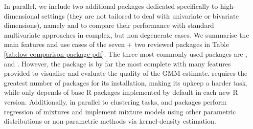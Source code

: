 In parallel, we include two additional packages dedicated specifically to high-dimensional settings (they are not tailored to deal with univariate or bivariate dimensions), namely  and  to compare their performance with standard multivariate approaches in complex, but non degenerate cases. We summarise the main features and use cases of the seven + two reviewed
packages in Table
\ref{tab:low-comparison-package-pdf}.
The three most commonly used packages are ,  and . However, the  package is by far the most complete with many features provided to visualise and evaluate the quality of the GMM estimate.  requires the greatest number of packages for its installation, making its upkeep
a harder task, while  only depends of base R packages
implemented by default in each new R version. Additionally, in parallel
to clustering tasks,  and  packages perform
regression of mixtures and implement mixture models using other
parametric distributions or non-parametric methods via kernel-density
estimation.

